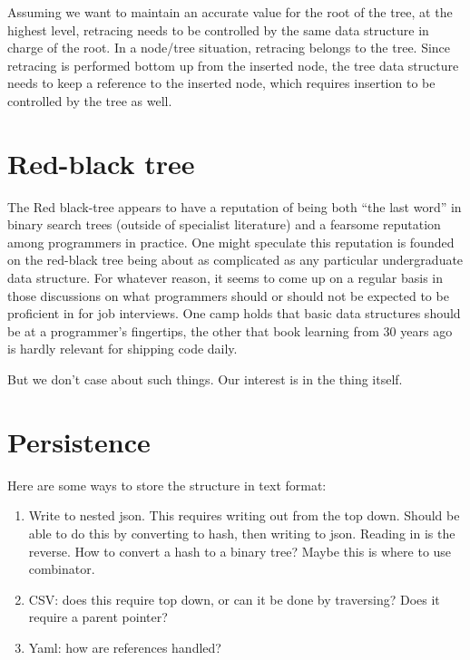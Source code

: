 \documentclass{article}
\begin{document}
Assuming we want to maintain an accurate value for the root of the tree,
at the highest level, retracing needs to be controlled by the same data
structure in charge of the root. In a node/tree situation, retracing
belongs to the tree. Since retracing is performed bottom up from the
inserted node, the tree data structure needs to keep a reference to
the inserted node, which requires insertion to be controlled by the
tree as well.

\section{Red-black tree}

The Red black-tree appears to have a reputation of being both ``the
last word'' in binary search trees (outside of specialist literature)
and a fearsome reputation among programmers in practice. One might
speculate this reputation is founded on the red-black tree being about
as complicated as any particular undergraduate data structure. For
whatever reason, it seems to come up on a regular basis in those
discussions on what programmers should or should not be expected to
be proficient in for job interviews. One camp holds that basic
data structures should be at a programmer's fingertips, the other
that book learning from 30 years ago is hardly relevant for shipping
code daily.

But we don't case about such things. Our interest is in the thing itself.



\section{Persistence}

Here are some ways to store the structure in text format:

\begin{enumerate}
\item Write to nested json. This requires writing out from the top
down. Should be able to do this by converting to hash, then
writing to json. Reading in is the reverse. How to convert a
hash to a binary tree? Maybe this is where to use combinator.

\item CSV: does this require top down, or can it be done by traversing?
Does it require a parent pointer?

\item Yaml: how are references handled?
\end{enumerate}
\end{document}
